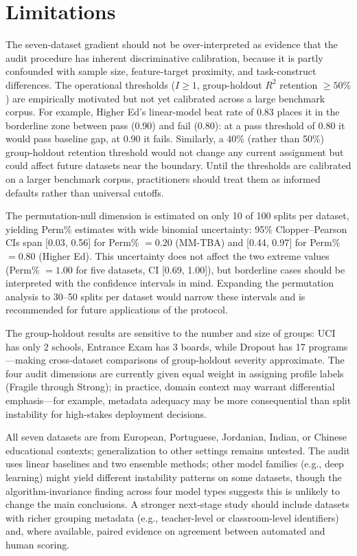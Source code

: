 \section{Limitations}

The seven-dataset gradient should not be over-interpreted as evidence that the audit procedure has inherent discriminative calibration, because it is partly confounded with sample size, feature-target proximity, and task-construct differences. The operational thresholds ($I \geq 1$, group-holdout $R^2$ retention $\geq 50\%$) are empirically motivated but not yet calibrated across a large benchmark corpus. For example, Higher Ed's linear-model beat rate of 0.83 places it in the borderline zone between pass (0.90) and fail (0.80): at a pass threshold of 0.80 it would pass baseline gap, at 0.90 it fails. Similarly, a 40\% (rather than 50\%) group-holdout retention threshold would not change any current assignment but could affect future datasets near the boundary. Until the thresholds are calibrated on a larger benchmark corpus, practitioners should treat them as informed defaults rather than universal cutoffs.

The permutation-null dimension is estimated on only 10 of 100 splits per dataset, yielding Perm\% estimates with wide binomial uncertainty: 95\% Clopper--Pearson CIs span [0.03, 0.56] for Perm\% $= 0.20$ (MM-TBA) and [0.44, 0.97] for Perm\% $= 0.80$ (Higher Ed). This uncertainty does not affect the two extreme values (Perm\% $= 1.00$ for five datasets, CI [0.69, 1.00]), but borderline cases should be interpreted with the confidence intervals in mind. Expanding the permutation analysis to 30--50 splits per dataset would narrow these intervals and is recommended for future applications of the protocol.

The group-holdout results are sensitive to the number and size of groups: UCI has only 2 schools, Entrance Exam has 3 boards, while Dropout has 17 programs---making cross-dataset comparisons of group-holdout severity approximate. The four audit dimensions are currently given equal weight in assigning profile labels (Fragile through Strong); in practice, domain context may warrant differential emphasis---for example, metadata adequacy may be more consequential than split instability for high-stakes deployment decisions.

All seven datasets are from European, Portuguese, Jordanian, Indian, or Chinese educational contexts; generalization to other settings remains untested. The audit uses linear baselines and two ensemble methods; other model families (e.g., deep learning) might yield different instability patterns on some datasets, though the algorithm-invariance finding across four model types suggests this is unlikely to change the main conclusions. A stronger next-stage study should include datasets with richer grouping metadata (e.g., teacher-level or classroom-level identifiers) and, where available, paired evidence on agreement between automated and human scoring.


